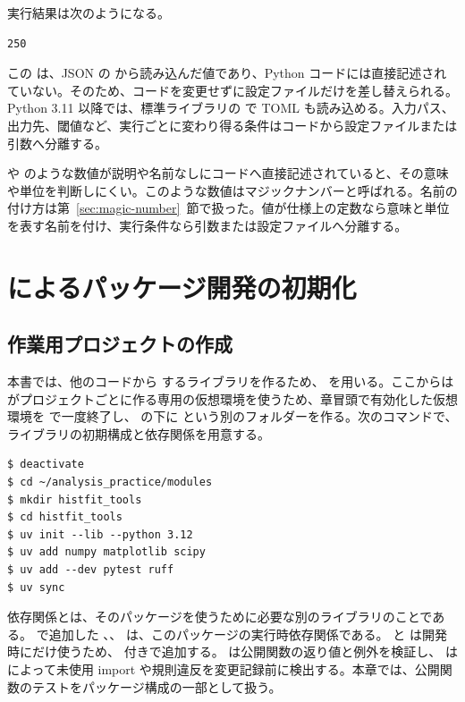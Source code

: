 実行結果は次のようになる。

\begin{lstlisting}[numbers=none, xleftmargin=2\zw]
250
\end{lstlisting}

この  は、JSON の  から読み込んだ値であり、Python コードには直接記述されていない。そのため、コードを変更せずに設定ファイルだけを差し替えられる。Python 3.11 以降では、標準ライブラリの  で TOML も読み込める。入力パス、出力先、閾値など、実行ごとに変わり得る条件はコードから設定ファイルまたは引数へ分離する。



 や  のような数値が説明や名前なしにコードへ直接記述されていると、その意味や単位を判断しにくい。このような数値はマジックナンバーと呼ばれる。名前の付け方は第~\ref{sec:magic-number}~節で扱った。値が仕様上の定数なら意味と単位を表す名前を付け、実行条件なら引数または設定ファイルへ分離する。

\section{ によるパッケージ開発の初期化}

\subsection{作業用プロジェクトの作成}

本書では、他のコードから  するライブラリを作るため、 を用いる。ここからは  がプロジェクトごとに作る専用の仮想環境を使うため、章冒頭で有効化した仮想環境を  で一度終了し、 の下に  という別のフォルダーを作る。次のコマンドで、ライブラリの初期構成と依存関係を用意する。

\begin{lstlisting}[numbers=none, xleftmargin=2\zw]
$ deactivate
$ cd ~/analysis_practice/modules
$ mkdir histfit_tools
$ cd histfit_tools
$ uv init --lib --python 3.12
$ uv add numpy matplotlib scipy
$ uv add --dev pytest ruff
$ uv sync
\end{lstlisting}

依存関係とは、そのパッケージを使うために必要な別のライブラリのことである。 で追加した 、、 は、このパッケージの実行時依存関係である。 と  は開発時にだけ使うため、 付きで追加する。 は公開関数の返り値と例外を検証し、 は  によって未使用 import や規則違反を変更記録前に検出する。本章では、公開関数のテストをパッケージ構成の一部として扱う。

